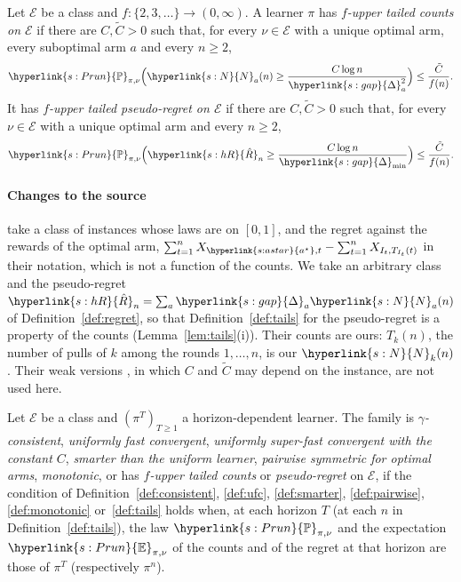\documentclass[11pt]{article}
\newcommand{\E}{\mathbb{E}}
\newcommand{\Prob}{\mathbb{P}}
\newcommand{\dt}[1]{\hypertarget{#1}{}}
\newcommand{\sy}[2]{{\hyperlink{#1}{#2}}}
\newcommand{\gap}{\sy{s:gap}{\Delta}}
\newcommand{\Pru}{\sy{s:Prun}{\Prob}}
\newcommand{\Er}{\sy{s:Prun}{\E}}
\newcommand{\Np}{\sy{s:N}{N}}
\newcommand{\hR}{\sy{s:hR}{\hat{R}}}
\newcommand{\as}{\sy{s:astar}{a^{\star}}}
\begin{document}
\begin{definition}\label{def:tails}
Let $\mathcal E$ be a class and $f:\{2,3,\dots\}\to(0,\infty)$. \dt{w:tailT}A learner $\pi$ has
\emph{$f$-upper tailed counts on $\mathcal E$} if there are $C,\tilde C>0$ such that, for every
$\nu\in\mathcal E$ with a unique optimal arm, every suboptimal arm $a$ and every $n\ge2$,
\begin{equation*}
  \Pru_{\pi,\nu}\Big(\Np_a(n)\ge\frac{C\log n}{\gap_a^2}\Big)\le\frac{\tilde C}{f(n)}.
\end{equation*}
\dt{w:tailR}It has \emph{$f$-upper tailed pseudo-regret on $\mathcal E$} if there are $C,\tilde C>0$
such that, for every $\nu\in\mathcal E$ with a unique optimal arm and every $n\ge2$,
\begin{equation*}
  \Pru_{\pi,\nu}\Big(\hR_n\ge\frac{C\log n}{\gap_{\min}}\Big)\le\frac{\tilde C}{f(n)}.
\end{equation*}
\end{definition}

\paragraph{Changes to the source} \citet[Definition~1]{SA11} take a class of instances whose laws are
on $[0,1]$, and the regret against the rewards of the optimal arm,
$\sum_{t=1}^nX_{\as,t}-\sum_{t=1}^nX_{I_t,T_{I_t}(t)}$ in their notation, which is not a function of
the counts. We take an arbitrary class and the pseudo-regret $\hR_n=\sum_a\gap_a\Np_a(n)$ of
Definition~\ref{def:regret}, so that Definition~\ref{def:tails} for the pseudo-regret is a
property of the counts (Lemma~\ref{lem:tails}(i)). Their counts are ours: $T_k(n)$, the number of
pulls of $k$ among the rounds $1,\dots,n$, is our $\Np_k(n)$. Their weak versions
\citep[Definition~3]{SA11}, in which $C$ and $\tilde C$ may depend on the instance, are not used here.

\begin{definition}\label{def:family}
Let $\mathcal E$ be a class and $(\pi^T)_{T\ge1}$ a horizon-dependent learner. \dt{w:family}The
family is \emph{$\gamma$-consistent}, \emph{uniformly fast convergent}, \emph{uniformly super-fast
convergent with the constant $C$}, \emph{smarter than the uniform learner}, \emph{pairwise symmetric
for optimal arms}, \emph{monotonic}, or has \emph{$f$-upper tailed counts} or \emph{pseudo-regret} on
$\mathcal E$, if the condition of Definition~\ref{def:consistent}, \ref{def:ufc}, \ref{def:smarter},
\ref{def:pairwise}, \ref{def:monotonic} or~\ref{def:tails} holds when, at each horizon $T$ (at each
$n$ in Definition~\ref{def:tails}), the law $\Pru_{\pi,\nu}$ and the expectation $\Er_{\pi,\nu}$ of the
counts and of the regret at that horizon are those of $\pi^T$ (respectively $\pi^n$).
\end{definition}
\end{document}
